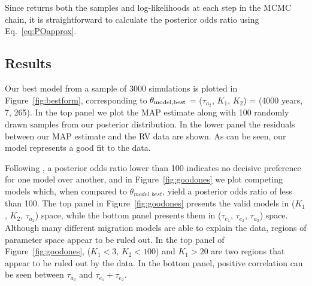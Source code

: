 Since \emcee returns both the samples and log-likelihoods at each step in the MCMC chain, it is straightforward to calculate the posterior odds ratio using Eq.~\ref{eq:POapprox}. 


\subsection{Results}
\label{sec:formresults}

Our best model from a sample of 3000 simulations is plotted in Figure~\ref{fig:bestform}, corresponding to $\theta_{\rm model, best}$ = ($\tau_{a_2}$, $K_1$, $K_2$) = (4000 years, 7, 265).
In the top panel we plot the MAP estimate along with 100 randomly drawn samples from our posterior distribution.
In the lower panel the residuals between our MAP estimate and the RV data are shown. 
As can be seen, our model represents a good fit to the data. 

Following \citet{Kass1995}, a posterior odds ratio lower than 100 indicates no decisive preference for one model over another, and in Figure~\ref{fig:goodones} we plot competing models which, when compared to $\theta_{model,best}$, yield a posterior odds ratio of less than 100. 
The top panel in Figure~\ref{fig:goodones} presents the valid models in ($K_1$, $K_2$, $\tau_{a_2}$) space, while the bottom panel presents them in ($\tau_{e_1}$, $\tau_{e_2}$, $\tau_{a_2}$) space. 
Although many different migration models are able to explain the data, regions of parameter space appear to be ruled out.
In the top panel of Figure~\ref{fig:goodones}, ($K_1 < 3$, $K_2 < 100$) and $K_1 > 20$ are two regions that appear to be ruled out by the data. 
In the bottom panel, positive correlation can be seen between $\tau_{a_2}$ and $\tau_{e_1} + \tau_{e_2}$.

